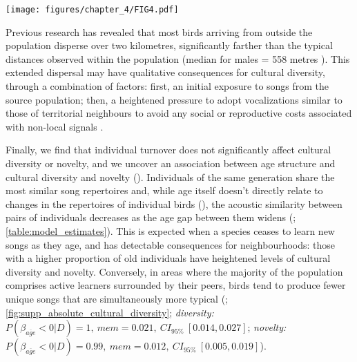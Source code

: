 \begin{figure*}[th!]
    \centering
    \texttt{[image: figures/chapter\_4/FIG4.pdf]}
    \label{c4_fig:turnover}
\end{figure*}

Previous research \parencite{verhulst1997} has revealed that most birds arriving from outside the population disperse over two kilometres, significantly farther than the typical distances observed within the population (median for males = 558 metres \parencite{greenwood1979}). This extended dispersal may have qualitative consequences for cultural diversity, through a combination of factors: first, an initial exposure to songs from the source population; then, a heightened pressure to adopt vocalizations similar to those of territorial neighbours to avoid any social or reproductive costs associated with non-local signals \parencite{payne1983, baker1981, mortega2014, lachlan2014, beecher2008}.

Finally, we find that individual turnover does not significantly affect cultural diversity or novelty, and we uncover an association between age structure and cultural diversity and novelty (). Individuals of the same generation share the most similar song repertoires and, while age itself doesn't directly relate to changes in the repertoires of individual birds (), the acoustic similarity between pairs of individuals decreases as the age gap between them widens (; \autoref{table:model_estimates}). This is expected when a species ceases to learn new songs as they age, and has detectable consequences for neighbourhoods: those with a higher proportion of old individuals have heightened levels of cultural diversity and novelty. Conversely, in areas where the majority of the population comprises active learners surrounded by their peers, birds tend to produce fewer unique songs that are simultaneously more typical (; \autoref{fig:supp_absolute_cultural_diversity}; \textit{diversity:} $P(\beta_{\overline{age}} < 0 | D) = 1,~mem=0.021,~CI_{95\%}~[0.014, 0.027]$; \textit{novelty:} $P(\beta_{\overline{age}} < 0 | D) = 0.99,~mem=0.012,~CI_{95\%}~[0.005, 0.019]$).

